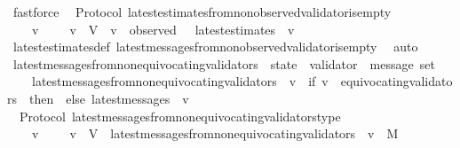 \begin{isabellebody}
\ fastforce%
\endisatagproof
{\isafoldproof}%
%
\isadelimproof
\isanewline
%
\endisadelimproof
\isanewline
{}\isamarkupfalse%
\ {\isacharparenleft}\ Protocol{\isacharparenright}\ latest{\isacharunderscore}estimates{\isacharunderscore}from{\isacharunderscore}non{\isacharunderscore}observed{\isacharunderscore}validator{\isacharunderscore}is{\isacharunderscore}empty\ {\isacharcolon}\isanewline
\ \ {\isachardoublequoteopen}{\isasymforall}\ {\isasymsigma}\ v{\isachardot}\ {\isasymsigma}\ {\isasymin}\ {\isasymSigma}\ {\isasymand}\ v\ {\isasymin}\ V\ {\isasymand}\ v\ {\isasymnotin}\ observed\ {\isasymsigma}\ {\isasymlongrightarrow}\ latest{\isacharunderscore}estimates\ {\isasymsigma}\ v\ {\isacharequal}\ {\isasymemptyset}{\isachardoublequoteclose}\isanewline
%
\isadelimproof
\ \ %
\endisadelimproof
%
\isatagproof
{}\isamarkupfalse%
\ latest{\isacharunderscore}estimates{\isacharunderscore}def\ latest{\isacharunderscore}messages{\isacharunderscore}from{\isacharunderscore}non{\isacharunderscore}observed{\isacharunderscore}validator{\isacharunderscore}is{\isacharunderscore}empty\ \isamarkupfalse%
\ auto%
\endisatagproof
{\isafoldproof}%
%
\isadelimproof
\isanewline
%
\endisadelimproof
\isanewline
\isanewline
\isanewline
\isanewline
\isanewline
{}\isamarkupfalse%
\ latest{\isacharunderscore}messages{\isacharunderscore}from{\isacharunderscore}non{\isacharunderscore}equivocating{\isacharunderscore}validators\ {\isacharcolon}{\isacharcolon}\ {\isachardoublequoteopen}state\ {\isasymRightarrow}\ validator\ {\isasymRightarrow}\ message\ set{\isachardoublequoteclose}\isanewline
\ \ \isanewline
\ \ \ \ {\isachardoublequoteopen}latest{\isacharunderscore}messages{\isacharunderscore}from{\isacharunderscore}non{\isacharunderscore}equivocating{\isacharunderscore}validators\ {\isasymsigma}\ v\ {\isacharequal}\ {\isacharparenleft}if\ v\ {\isasymin}\ equivocating{\isacharunderscore}validators\ {\isasymsigma}\ then\ {\isasymemptyset}\ else\ latest{\isacharunderscore}messages\ {\isasymsigma}\ v{\isacharparenright}{\isachardoublequoteclose}\isanewline
\isanewline
{}\isamarkupfalse%
\ {\isacharparenleft}\ Protocol{\isacharparenright}\ latest{\isacharunderscore}messages{\isacharunderscore}from{\isacharunderscore}non{\isacharunderscore}equivocating{\isacharunderscore}validators{\isacharunderscore}type\ {\isacharcolon}\isanewline
\ \ {\isachardoublequoteopen}{\isasymforall}\ {\isasymsigma}\ v{\isachardot}\ {\isasymsigma}\ {\isasymin}\ {\isasymSigma}\ {\isasymand}\ v\ {\isasymin}\ V\ {\isasymlongrightarrow}\ latest{\isacharunderscore}messages{\isacharunderscore}from{\isacharunderscore}non{\isacharunderscore}equivocating{\isacharunderscore}validators\ {\isasymsigma}\ v\ {\isasymsubseteq}\ M{\isachardoublequoteclose}\isanewline

\end{isabellebody}
